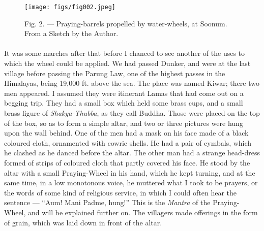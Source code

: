 \documentclass[a4paper, 11pt, oneside, polutonikogreek, english]{article}
\begin{document}
\begin{figure}[H]
\centering
\texttt{[image: figs/fig002.jpeg]}
\caption{Fig. 2. --- Praying-barrels propelled by water-wheels, at Soonum. From a Sketch by the Author.}
\end{figure}
\paragraph{}
It was some marches after that before I chanced to see another of the uses to which the wheel could be applied. We had passed Dunker, and were at the last village before passing the Parung Law, one of the highest passes in the Himalayas, being 19,000 ft. above the sea. The place was named Kiwar; there two men appeared. I assumed they were itinerant Lamas that had come out on a begging trip. They had a small box which held some brass cups, and a small brass figure of \emph{Shakya-Thubba}, as they call Buddha. Those were placed on the top of the box, so as to form a simple altar, and two or three pictures were hung upon the wall behind. One of the men had a mask on his face made of a black coloured cloth, ornamented with cowrie shells. He had a pair of cymbals, which he clashed as he danced before the altar. The other man had a strange head-dress formed of strips of coloured cloth that partly covered his face. He stood by the altar with a small Praying-Wheel in his hand, which he kept turning, and at the same time, in a low monotonous voice, he muttered what I took to be prayers, or the words of some kind of religious service, in which I could often hear the sentence --- ``Aum! Mani Padme, hung!'' This is the \emph{Mantra} of the Praying-Wheel, and will be explained further on. The villagers made offerings in the form of grain, which was laid down in front of the altar.
\end{document}
